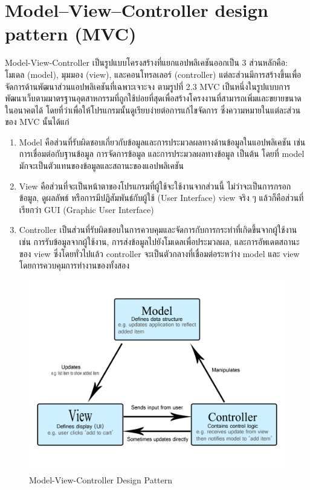 \section{Model–View–Controller design pattern (MVC)}
Model-View-Controller \cite{mvc} เป็นรูปแบบโครงสร้างที่แยกแอปพลิเคชันออกเป็น 3 ส่วนหลักคือ: โมเดล (model), มุมมอง (view), 
และคอนโทรลเลอร์ (controller) แต่ละส่วนมีการสร้างขึ้นเพื่อจัดการด้านพัฒนาส่วนแอปพลิเคชันที่เฉพาะเจาะจง ตามรูปที่ 2.3 MVC 
เป็นหนึ่งในรูปแบบการพัฒนาเว็บตามมาตรฐานอุตสาหกรรมที่ถูกใช้บ่อยที่สุดเพื่อสร้างโครงงานที่สามารถเพิ่มและขยายขนาดในอนาคตได้ 
โดยที่ว่าเพื่อให้โปรแกรมนั้นดูเรียบง่ายต่อการแก้ไขจัดการ ซึ่งความหมายในแต่ละส่วนของ MVC นั้นได้แก่ 
\begin{enumerate}
  \item Model คือส่วนที่รับผิดชอบเกี่ยวกับข้อมูลและการประมวลผลทางด้านข้อมูลในแอปพลิเคชัน เช่น การเชื่อมต่อกับฐานข้อมูล การจัดการข้อมูล 
  และการประมวลผลทางข้อมูล เป็นต้น โดยที่ model มักจะเป็นตัวแทนของข้อมูลและสถานะของแอปพลิเคชัน
  \item View คือส่วนที่จะเป็นหน้าตาของโปรแกรมที่ผู้ใช้จะใช้งานจากส่วนนี้ ไม่ว่าจะเป็นการกรอกข้อมูล, ดูผลลัพธ์ หรือการมีปฏิสัมพันธ์กับผู้ใช้ 
  (User Interface) view จริง ๆ แล้วก็คือส่วนที่เรียกว่า GUI (Graphic User Interface) 
  \item Controller เป็นส่วนที่รับผิดชอบในการควบคุมและจัดการกับการกระทำที่เกิดขึ้นจากผู้ใช้งาน เช่น การรับข้อมูลจากผู้ใช้งาน, 
  การส่งข้อมูลไปยังโมเดลเพื่อประมวลผล, และการอัพเดตสถานะของ view ซึ่งโดยทั่วไปแล้ว controller จะเป็นตัวกลางที่เชื่อมต่อระหว่าง model 
  และ view โดยการควบคุมการทำงานของทั้งสอง 
\end{enumerate}
\begin{figure}[h]
  \begin{center}
  \includegraphics[scale=0.3]{resources/MVC.png}
  \end{center}
  \caption[Model-View-Controller]{Model-View-Controller Design Pattern}
  \label{fig:mvc}
\end{figure}

